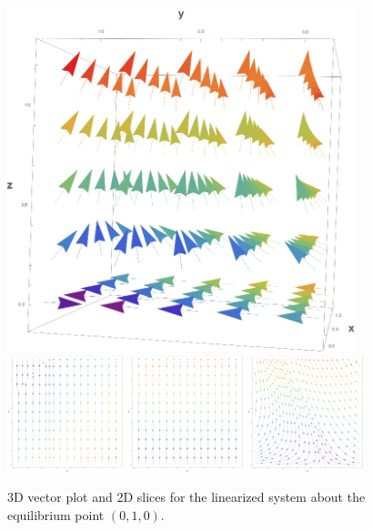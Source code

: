\documentclass[10pt]{article}
\newcommand{\np}{\vfill\newpage}
\begin{document}
\begin{figure}[h!]
\centering
\includegraphics[width=0.9\textwidth]{secondeqpoint3d.png} \\
\includegraphics[width=0.3\textwidth]{secondeqpointxy.png}
\includegraphics[width=0.3\textwidth]{secondeqpointxz.png}
\includegraphics[width=0.3\textwidth]{secondeqpointyz.png}
\caption{3D vector plot and 2D slices for the linearized system about the equilibrium point \( (0,1,0) \).}
\label{fig:secondeqpoint}
\end{figure}
\np
\end{document}
